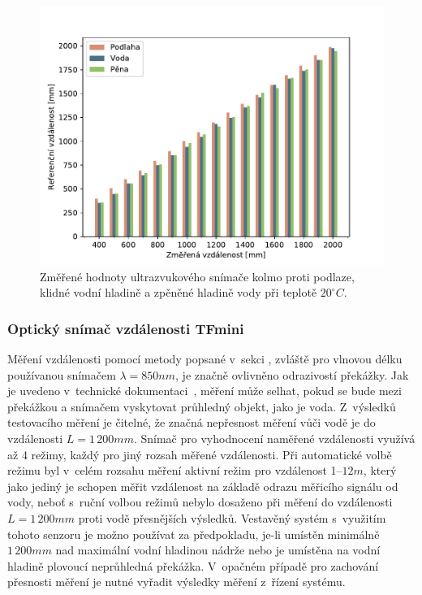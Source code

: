         \begin{figure}[h]
            \centering
            \includegraphics[width=\linewidth]{obrazky-figures/jsn_mes.pdf}
            \caption{Změřené hodnoty ultrazvukového snímače  kolmo proti podlaze, klidné vodní hladině a zpěněné hladině vody při teplotě $20^\circ\unit{C}$.}
            \label{img:m_jsn}
        \end{figure}

        \subsubsection{Optický snímač vzdálenosti TFmini}
            Měření vzdálenosti pomocí metody popsané v~sekci , zvláště pro vlnovou délku používanou snímačem $\lambda = 850\unit{nm}$, je značně ovlivněno odrazivostí překážky. Jak je uvedeno v~technické dokumentaci~\cite{sensor:lidar}, měření může selhat, pokud se bude mezi překážkou a snímačem vyskytovat průhledný objekt, jako je voda. Z~výsledků testovacího měření je čitelné, že značná nepřesnost měření vůči vodě je do vzdálenosti $L = 1\,200\unit{mm}$. Snímač pro vyhodnocení naměřené vzdálenosti využívá až 4 režimy, každý pro jiný rozsah měřené vzdálenosti. Při automatické volbě režimu byl v~celém rozsahu měření aktivní režim pro vzdálenost 1--$12\unit{m}$, který jako jediný je schopen měřit vzdálenost na základě odrazu měřicího signálu od vody, neboť s~ruční volbou režimů nebylo dosaženo při měření do vzdálenosti $L = 1\,200\unit{mm}$ proti vodě přesnějších výsledků. 
            Vestavěný systém s~využitím tohoto senzoru je možno používat za předpokladu, je-li umístěn minimálně $1\,200\unit{mm}$ nad maximální vodní hladinou nádrže nebo je umístěna na vodní hladině plovoucí neprůhledná překážka. V~opačném případě pro zachování přesnosti měření je nutné vyřadit výsledky měření  z~řízení systému.

